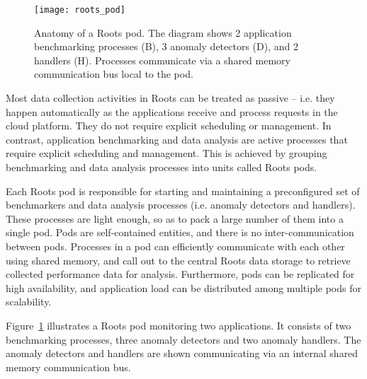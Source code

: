 \begin{figure}
\centering
\texttt{[image: roots\_pod]}
\caption{Anatomy of a Roots pod. The diagram shows 2 application benchmarking processes (B), 
3 anomaly detectors (D), and 2 handlers (H). Processes communicate via a shared
memory communication bus local to the pod.}
\label{fig:roots_pod}
\end{figure}
Most data collection activities in Roots can be treated as passive -- i.e. they
happen automatically as the applications receive and process requests in the cloud
platform. They do not require explicit scheduling or management. In contrast,
application benchmarking and data analysis are active processes that require
explicit scheduling and management.  This is achieved by grouping benchmarking
and data analysis processes into units called Roots pods. 

Each Roots pod is responsible for starting and maintaining a preconfigured set of
benchmarkers and data analysis processes (i.e. anomaly detectors and handlers). 
These processes are light enough, so as to pack a large number of them
into a single pod. Pods are self-contained entities, and there is no inter-communication
between pods. Processes in a pod can efficiently communicate with each other 
using shared memory, and call out to the central Roots data storage to retrieve 
collected performance data for analysis. 
Furthermore, pods
can be replicated for high availability, and application load can be distributed
among multiple pods for scalability.

Figure~\ref{fig:roots_pod} illustrates a Roots pod monitoring two applications.
It consists of two benchmarking processes, three anomaly detectors and 
two anomaly handlers. The anomaly detectors and handlers are shown communicating
via an internal shared memory communication bus. 

